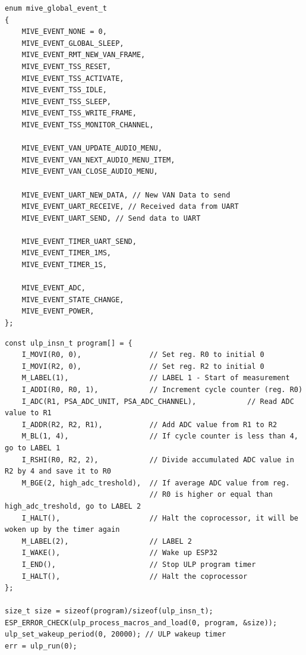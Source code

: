 \begin{listing}[H]
  \begin{verbatim}
enum mive_global_event_t
{
    MIVE_EVENT_NONE = 0,
    MIVE_EVENT_GLOBAL_SLEEP,
    MIVE_EVENT_RMT_NEW_VAN_FRAME,
    MIVE_EVENT_TSS_RESET,
    MIVE_EVENT_TSS_ACTIVATE,
    MIVE_EVENT_TSS_IDLE,
    MIVE_EVENT_TSS_SLEEP,
    MIVE_EVENT_TSS_WRITE_FRAME,
    MIVE_EVENT_TSS_MONITOR_CHANNEL,

    MIVE_EVENT_VAN_UPDATE_AUDIO_MENU,
    MIVE_EVENT_VAN_NEXT_AUDIO_MENU_ITEM,
    MIVE_EVENT_VAN_CLOSE_AUDIO_MENU,

    MIVE_EVENT_UART_NEW_DATA, // New VAN Data to send
    MIVE_EVENT_UART_RECEIVE, // Received data from UART
    MIVE_EVENT_UART_SEND, // Send data to UART

    MIVE_EVENT_TIMER_UART_SEND,
    MIVE_EVENT_TIMER_1MS,
    MIVE_EVENT_TIMER_1S,

    MIVE_EVENT_ADC,
    MIVE_EVENT_STATE_CHANGE,
    MIVE_EVENT_POWER,
};
  \end{verbatim}
  \caption{Popis događaja dostupnih u programskoj podršci}
  \label{lst:enum-mive_global_event_t}
\end{listing}

\begin{listing}[H]
  \begin{verbatim}
const ulp_insn_t program[] = {
    I_MOVI(R0, 0),                // Set reg. R0 to initial 0
    I_MOVI(R2, 0),                // Set reg. R2 to initial 0
    M_LABEL(1),                   // LABEL 1 - Start of measurement
    I_ADDI(R0, R0, 1),            // Increment cycle counter (reg. R0)
    I_ADC(R1, PSA_ADC_UNIT, PSA_ADC_CHANNEL),            // Read ADC value to R1
    I_ADDR(R2, R2, R1),           // Add ADC value from R1 to R2
    M_BL(1, 4),                   // If cycle counter is less than 4, go to LABEL 1
    I_RSHI(R0, R2, 2),            // Divide accumulated ADC value in R2 by 4 and save it to R0
    M_BGE(2, high_adc_treshold),  // If average ADC value from reg. 
                                  // R0 is higher or equal than high_adc_treshold, go to LABEL 2
    I_HALT(),                     // Halt the coprocessor, it will be woken up by the timer again
    M_LABEL(2),                   // LABEL 2
    I_WAKE(),                     // Wake up ESP32
    I_END(),                      // Stop ULP program timer
    I_HALT(),                     // Halt the coprocessor
};

size_t size = sizeof(program)/sizeof(ulp_insn_t);
ESP_ERROR_CHECK(ulp_process_macros_and_load(0, program, &size));
ulp_set_wakeup_period(0, 20000); // ULP wakeup timer
err = ulp_run(0);
  \end{verbatim}
  \caption{ULP kod koji se izvodi tijekom dubokog sna.}
  \label{lst:ulp-deep-sleep}
\end{listing}

